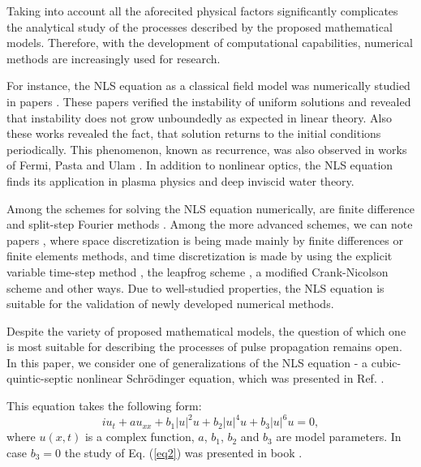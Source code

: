 \documentclass[preprint,12pt]{elsarticle}
\begin{document}
Taking into account all the aforecited physical factors significantly complicates the analytical study of the processes described by the proposed mathematical models. Therefore, with the development of computational capabilities, numerical methods are increasingly used for research.

For instance, the NLS equation as a classical field model was numerically studied in papers \cite{Rad04,Rad05}. These papers verified the instability of uniform solutions and revealed that instability does not grow unboundedly as expected in linear theory. Also these works revealed the fact, that solution returns to the initial conditions periodically. This phenomenon, known as recurrence, was also observed in works of Fermi, Pasta and Ulam \cite{Rad06}. In addition to nonlinear optics, the NLS equation finds its application in plasma physics and deep inviscid water theory.

Among the schemes for solving the NLS equation numerically, are finite difference and split-step Fourier methods \cite{Rad04,Rad07}. Among the more advanced schemes, we can note papers \cite{Rad08,Rad09,Rad010,Rad011,Rad012,Rad013,QIN2022126580}, where space discretization is being made mainly by finite differences or finite elements methods, and time discretization is made by using the explicit variable time-step method \cite{Rad08,Rad09}, the leapfrog scheme \cite{Rad010}, a modified Crank-Nicolson scheme \cite{Rad011} and other ways. Due to well-studied properties, the NLS equation is suitable for the validation of newly developed numerical methods.

Despite the variety of proposed mathematical models, the question of which one is most suitable for describing the processes of pulse propagation remains open.
In this paper, we consider one of generalizations of the NLS equation - a cubic-quintic-septic nonlinear Schr\"{o}dinger equation, which was presented in Ref. \cite{Rad3}. 

This equation takes the following form:
\begin{equation}\label{eq2}
iu_{t}+au_{xx}+b_{1}|u|^2 u+b_{2}|u|^4 u+b_{3}|u|^6 u=0,
\end{equation}
where \(u(x,t)\) is a complex function, \(a\), \(b_{1}\), \(b_{2}\) and \(b_{3}\) are model parameters. In case \(b_{3}=0\) the study of Eq. (\ref{eq2}) was presented in book \cite{Rad02}.
\end{document}
